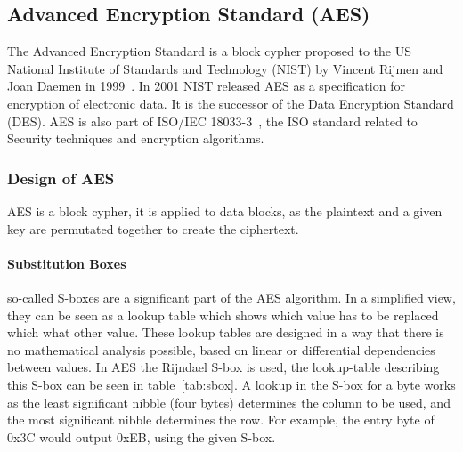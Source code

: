 \subsection{Advanced Encryption Standard (AES)}

The Advanced Encryption Standard is a block cypher proposed to the US National
Institute of Standards and Technology  (NIST) by Vincent Rijmen and Joan Daemen
in 1999~\cite{aesproposal}. In 2001 NIST released AES as a specification for
encryption of electronic data. It is the successor of the Data Encryption
Standard (DES). AES is also part of ISO/IEC 18033-3~\cite{iso18033}, the ISO
standard related to Security techniques and encryption algorithms.

\subsubsection{Design of AES}

AES is a block cypher, it is applied to data blocks, as the plaintext and a
given key are permutated together to create the ciphertext.

\paragraph{Substitution Boxes} so-called S-boxes are a significant part of the
AES algorithm. In a simplified view, they can be seen as a lookup table which
shows which value has to be replaced which what other value. These lookup tables
are designed in a way that there is no mathematical analysis possible, based on
linear or differential dependencies between values. In AES the Rijndael S-box is
used, the lookup-table describing this S-box can be seen in
table~\ref{tab:sbox}. A lookup in the S-box for a byte works as the least
significant nibble (four bytes) determines the column to be used, and the most
significant nibble determines the row. For example, the entry byte of  0x3C
would output 0xEB, using the given S-box.

